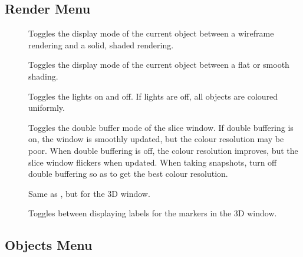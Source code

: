\subsection{Render Menu}

\begin{description}
\item[]  Toggles the display mode of the
        current object between a wireframe rendering and a solid, shaded 
        rendering.
\item[]  Toggles the display mode of the
        current object between a flat or smooth shading.
\item[]  Toggles the lights on and off.  If lights
        are off, all objects are coloured uniformly.
\item[]  Toggles the double buffer mode of the
        slice window.  If double buffering is on, the window is smoothly
        updated, but the colour resolution may be poor.
        When double buffering is off, the colour resolution improves, but
        the slice window flickers when updated.  When taking snapshots,
        turn off double buffering so as to get the best colour resolution.
\item[]  Same as ,
        but for the 3D window.
\item[]  Toggles between displaying labels
        for the markers in the 3D window.
\end{description}

\subsection{Objects Menu}

